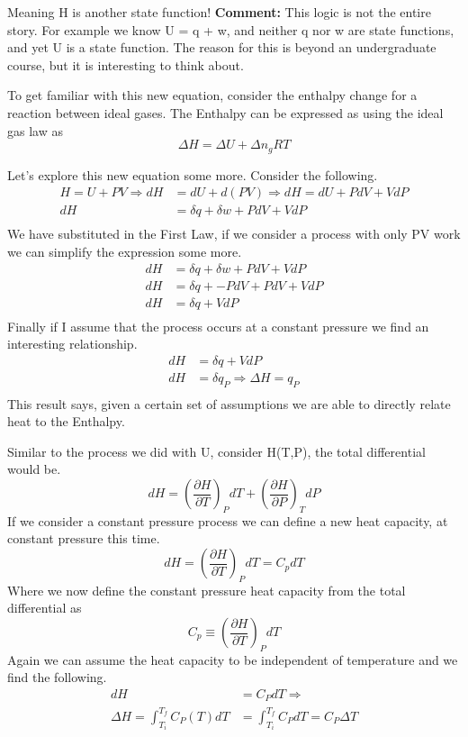 \documentclass{article}
\newcommand{\be}{\begin{equation}}
\newcommand{\ee}{\end{equation}}
\newcommand{\pd}{\partial}
\begin{document}
Meaning H is another state function!
\textbf{Comment:} This logic is not the entire story. 
For example we know U = q + w, and neither q nor w are state functions, and yet U is a state function. 
The reason for this is beyond an undergraduate course, but it is interesting to think about. 

To get familiar with this new equation, consider the enthalpy change for a reaction between ideal gases. 
The Enthalpy can be expressed as using the ideal gas law as
\be
\Delta H = \Delta U + \Delta n_g RT
\ee

Let's explore this new equation some more. 
Consider the following.
\be
\begin{split}
H = U + PV \Rightarrow dH &= dU + d(PV) \Rightarrow dH = dU + PdV + VdP \\
dH &= \delta q + \delta w + PdV + VdP\\
\end{split}
\ee
We have substituted in the First Law, if we consider a process with only PV work we can simplify the expression some more.
\be
\begin{split}
dH &= \delta q + \delta w + PdV + VdP\\
dH &= \delta q + -PdV + PdV + VdP\\
dH &= \delta q + VdP\\
\end{split}
\ee
Finally if I assume that the process occurs at a constant pressure we find an interesting relationship. 
\be
\begin{split}
dH &= \delta q + VdP\\
dH &= \delta q_P \Rightarrow \Delta H = q_P \\
\end{split}
\ee
This result says, given a certain set of assumptions we are able to directly relate heat to the Enthalpy. 

Similar to the process we did with U, consider H(T,P), the total differential would be. 
\be
dH = \left(\frac{\pd H}{\pd T}\right)_PdT + \left(\frac{\pd H}{\pd P}\right)_T dP
\ee
If we consider a constant pressure process we can define a new heat capacity, at constant pressure this time. 
\be
dH = \left(\frac{\pd H}{\pd T}\right)_PdT = C_pdT
\ee
Where we now define the constant pressure heat capacity from the total differential as
\be
C_p \equiv \left(\frac{\pd H}{\pd T}\right)_PdT 
\ee
Again we can assume the heat capacity to be independent of temperature and we find the following. 
\be
\begin{split}
dH &= C_PdT \Rightarrow \\
\Delta H = \int_{T_i}^{T_f} C_P(T) dT &= \int_{T_i}^{T_f} C_P dT = C_P\Delta T
\end{split}
\ee
\end{document}
